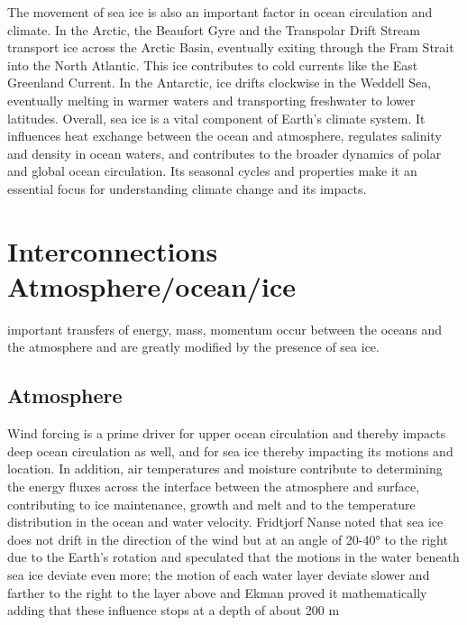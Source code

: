 The movement of sea ice is also an important factor in ocean circulation and climate. In the Arctic, the Beaufort Gyre and the Transpolar Drift Stream transport ice across the Arctic Basin, eventually exiting through the Fram Strait into the North Atlantic. This ice contributes to cold currents like the East Greenland Current. In the Antarctic, ice drifts clockwise in the Weddell Sea, eventually melting in warmer waters and transporting freshwater to lower latitudes.
Overall, sea ice is a vital component of Earth's climate system. It influences heat exchange between the ocean and atmosphere, regulates salinity and density in ocean waters, and contributes to the broader dynamics of polar and global ocean circulation. Its seasonal cycles and properties make it an essential focus for understanding climate change and its impacts.

\section{Interconnections Atmosphere/ocean/ice}
important transfers of energy, mass, momentum occur between the oceans and the atmosphere and are greatly modified by the presence of sea ice.
\subsection{Atmosphere}
Wind forcing is a prime driver for upper ocean circulation and thereby impacts deep ocean circulation as well, and for sea ice thereby impacting its motions and location. In addition, air temperatures and moisture contribute to determining the energy fluxes across the interface between the atmosphere and surface, contributing to ice maintenance, growth and melt and to the temperature distribution in the ocean and water velocity.
Fridtjorf Nanse noted that sea ice does not drift in the direction of the wind but at an angle of 20-40° to the right due to the Earth’s rotation and speculated that the motions in the water beneath sea ice deviate even more; the motion of each water layer deviate slower and farther to the right to the layer above and Ekman proved it mathematically adding that these influence stops at a depth of about 200 m

